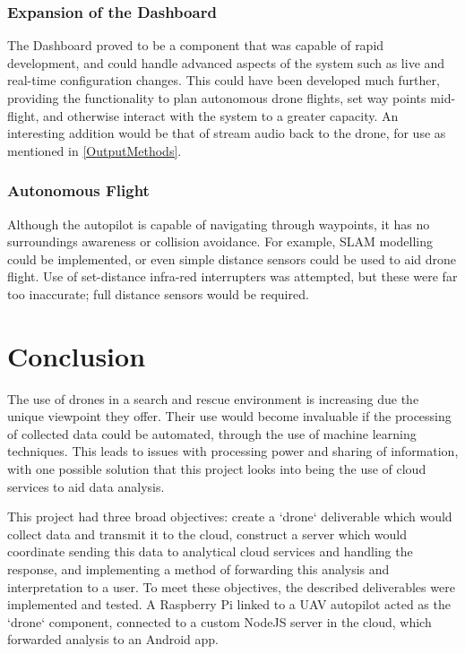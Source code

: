 \documentclass{article}
\begin{document}
\subsubsection{Expansion of the Dashboard}
The Dashboard proved to be a component that was capable of rapid development, and could handle advanced aspects of the system such as live and real-time configuration changes. This could have been developed much further, providing the functionality to plan autonomous drone flights, set way points mid-flight, and otherwise interact with the system to a greater capacity. An interesting addition would be that of stream audio back to the drone, for use as mentioned in \ref{OutputMethods}.

\subsubsection{Autonomous Flight}
Although the autopilot is capable of navigating through waypoints, it has no surroundings awareness or collision avoidance. For example, SLAM modelling could be implemented, or even simple distance sensors could be used to aid drone flight. Use of set-distance infra-red interrupters was attempted, but these were far too inaccurate; full distance sensors would be required. 

\section{Conclusion}

The use of drones in a search and rescue environment is increasing due the unique viewpoint they offer. Their use would become invaluable if the processing of collected data could be automated, through the use of machine learning techniques. This leads to issues with processing power and sharing of information, with one possible solution that this project looks into being the use of cloud services to aid data analysis.

This project had three broad objectives: create a `drone` deliverable which would collect data and transmit it to the cloud, construct a server which would coordinate sending this data to analytical cloud services and handling the response, and implementing a method of forwarding this analysis and interpretation to a user. To meet these objectives, the described deliverables were implemented and tested. A Raspberry Pi linked to a UAV autopilot acted as the `drone` component, connected to a custom NodeJS server in the cloud, which forwarded analysis to an Android app.
\end{document}
